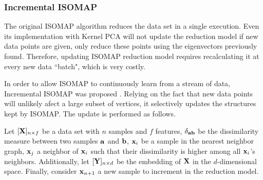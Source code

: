 \subsubsection{Incremental ISOMAP}

The original ISOMAP algorithm reduces the data set in a single execution. Even its implementation with Kernel PCA will not update the reduction model if new data points are given, only reduce these points using the eigenvectors previously found. Therefore, updating ISOMAP reduction model requires recalculating it at every new data ``batch", which is very costly.

In order to allow ISOMAP to continuously learn from a stream of data, Incremental ISOMAP was proposed \cite{law2006incremental}. Relying on the fact that new data points will unlikely afect a large subset of vertices, it selectively updates the structures kept by ISOMAP. The update is performed as follows.

Let $[\mathbf{X}]_{n \times f}$ be a data set with $n$ samples and $f$ features, $\delta_{\mathbf{a} \mathbf{b}}$ be the dissimilarity measure between two samples $\mathbf{a}$ and $\mathbf{b}$, $\mathbf{x}_i$ be a sample in the nearest neighbor graph, $\mathbf{x}_j$ a neighbor of $\mathbf{x}_i$ such that their dissimilarity is higher among all $\mathbf{x}_i$'s neighbors. Additionally, let $[\mathbf{Y}]_{n \times d}$ be the embedding of $\mathbf{X}$ in the $d$-dimensional space. Finally, consider $\mathbf{x}_{n+1}$ a new sample to increment in the reduction model.

